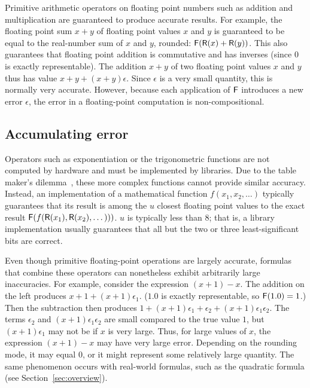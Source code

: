 \documentclass[paper.tex]{subfiles}
\begin{document}
Primitive arithmetic operators on floating point numbers such as
addition and multiplication are guaranteed to produce accurate
results.  For example, the floating point sum $x + y$ of floating
point values $x$ and $y$ is guaranteed to be equal to the real-number
sum of $x$ and $y$, rounded: $\mathsf{F}(\mathsf{R}(x) + \mathsf{R}(y))$.  This also
guarantees that floating point addition is commutative and has
inverses (since $0$ is exactly representable).  
The addition $x + y$ of two floating point values $x$ and $y$
  thus has value $x + y + (x + y)\epsilon$.
Since $\epsilon$ is a very small quantity, this is normally very accurate.
However, because each application of $\mathsf{F}$ introduces a new error $\epsilon$,
  the error in a floating-point computation is non-compositional.

\subsection{Accumulating error}

Operators such as exponentiation or the trigonometric functions
  are not computed by hardware
  and must be implemented by libraries.
Due to the table maker's dilemma~\cite{ensl03-table-maker},
  these more complex functions cannot provide similar accuracy.
Instead, an implementation of a mathematical function $f(x_1, x_2, \dotsc)$
  typically guarantees that its result is among
  the $u$ closest floating point values
  to the exact result $\mathsf{F}(f(\mathsf{R}(x_1), \mathsf{R}(x_2), \dotsc)))$.
$u$ is typically less than 8;
  that is, a library implementation usually guarantees that
  all but the two or three least-significant bits are correct.

Even though primitive floating-point operations are largely accurate,
  formulas that combine these operators
  can nonetheless exhibit arbitrarily large inaccuracies.
For example, consider the expression $(x + 1) - x$.
The addition on the left produces $x + 1 + (x + 1)\epsilon_1$.
($1.0$ is exactly representable, so $\mathsf{F}(1.0) = 1$.)
Then the subtraction then produces
$1 + (x + 1) \epsilon_1 + \epsilon_2 + (x + 1) \epsilon_1 \epsilon_2$.
The terms $\epsilon_2$ and $(x+1)\epsilon_1\epsilon_2$
  are small compared to the true value $1$,
  but $(x + 1) \epsilon_1$ may not be if $x$ is very large.
Thus, for large values of $x$, the expression $(x + 1) - x$
  may have very large error.
Depending on the rounding mode, it may equal $0$, or it might
  represent some relatively large quantity.
The same phenomenon occurs with real-world formulas,
  such as the quadratic formula (see Section~\ref{sec:overview}).
\end{document}
